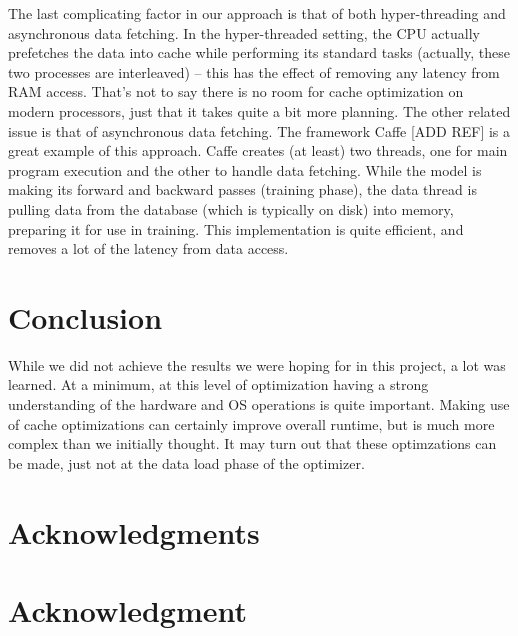 \documentclass[,conference,compsoc]{IEEEtran}
\begin{document}
The last complicating factor in our approach is that of both hyper-threading and
asynchronous data fetching. In the hyper-threaded setting, the CPU actually
prefetches the data into cache while performing its standard tasks (actually,
these two processes are interleaved) -- this has the effect of removing any
latency from RAM access. That's not to say there is no room for cache
optimization on modern processors, just that it takes quite a bit more planning.
The other related issue is that of asynchronous data fetching. The framework
Caffe [ADD REF] is a great example of this approach. Caffe creates (at least)
two threads, one for main program execution and the other to handle data
fetching. While the model is making its forward and backward passes (training
phase), the data thread is pulling data from the database (which is typically on
disk) into memory, preparing it for use in training. This implementation is
quite efficient, and removes a lot of the latency from data access.

\section{Conclusion}
While we did not achieve the results we were hoping for in this project, a lot
was learned. At a minimum, at this level of optimization having a strong
understanding of the hardware and OS operations is quite important. Making use
of cache optimizations can certainly improve overall runtime, but is much more
complex than we initially thought. It may turn out that these optimzations can
be made, just not at the data load phase of the optimizer.




\ifCLASSOPTIONcompsoc
  \section*{Acknowledgments}
\else
  \section*{Acknowledgment}
\fi




\end{document}
